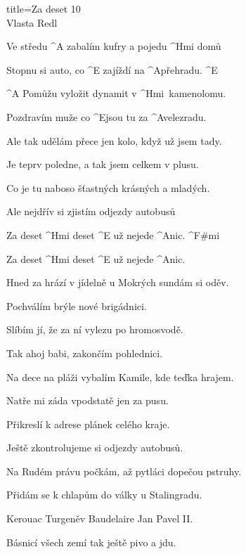 \begin{song}{title=\predtitle\centering Za deset 10 \\\large Vlasta Redl  \vspace*{-0.3cm}}  %
\begin{centerjustified}
\normalni

\begin{varwidth}[t]{0.50\textwidth}\setlength{\parindent}{0.0cm}  %

\sloka
	Ve středu ^{A \z}zabalím kufry a pojedu ^{Hmi \z}domů
	
	Stopnu si auto, co ^{E \z}zajíždí na ^{\z A}přehradu. ^{E}

	^{A \z}Pomůžu vyložit dynamit v ^{\z Hmi \,}kamenolomu.

	Pozdravím muže co ^{E}jsou tu za ^{\z A}velezradu.

	\mezera

	Ale tak udělám přece jen kolo, když už jsem tady.
	
	Je teprv poledne, a tak jsem celkem v plusu.

	Co je tu naboso šťastných krásných a mladých.

	Ale nejdřív si zjistím odjezdy autobusů

	Za deset ^{Hmi \z}deset ^{E} už nejede ^{A}nic. ^{F\#mi}

	Za deset ^{Hmi \z}deset ^{E} už nejede ^{A}nic.

\sloka
	Hned za hrází v jídelně u Mokrých sundám si oděv.

	Pochválím brýle nové brigádnici.

	Slíbím jí, že za ní vylezu po hromosvodě.
	
	Tak ahoj babi, zakončím pohlednici.
	
	Na dece na pláži vybalím Kamile, kde teďka hrajem.
	
	Natře mi záda vpodstatě jen za pusu.
	
	Přikreslí k adrese plánek celého kraje.
	
	Ještě zkontrolujeme si odjezdy autobusů.


\sloka
	Na Rudém právu počkám, až pytláci dopečou pstruhy.

	Přidám se k chlapům do války u Stalingradu.

	Kerouac Turgeněv Baudelaire Jan Pavel II.
	
	Básnicí všech zemí tak ještě pivo a jdu.
	

\end{varwidth}
\end{centerjustified}
\end{song}
